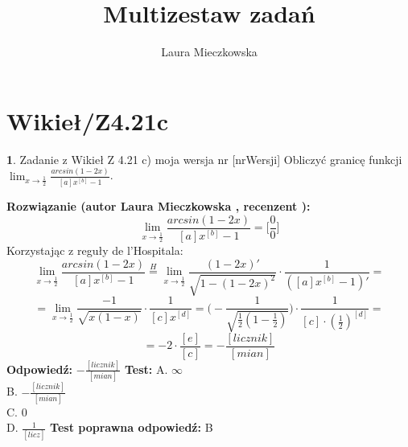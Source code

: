 \documentclass[12pt, a4paper]{article}
\title{Multizestaw zadań}
\author{Laura Mieczkowska}
\date{}
\theoremstyle{definition} %
\newtheorem{zad}{}
\newcommand{\kategoria}[1]{\section{#1}} %
\newcommand{\zadStart}[1]{\begin{zad}#1\newline} %
\newcommand{\zadStop}{\end{zad}}   %
\newcommand{\rozwStart}[2]{\noindent \textbf{Rozwiązanie (autor #1 , recenzent #2): }\newline} %
\newcommand{\odpStart}{\noindent \textbf{Odpowiedź:}\newline}    %
\newcommand{\odpStop}{\newline}                                             %
\newcommand{\testStart}{\noindent \textbf{Test:}\newline} %
\newcommand{\testStop}{\newline} %
\newcommand{\kluczStart}{\noindent \textbf{Test poprawna odpowiedź:}\newline} %
\newcommand{\kluczStop}{\newline} %
\begin{document}
\maketitle


\kategoria{Wikieł/Z4.21c}
\zadStart{Zadanie z Wikieł Z 4.21 c) moja wersja nr [nrWersji]}
Obliczyć granicę funkcji $\lim_{x \to \frac{1}{2}} \frac{arcsin(1-2x)}{[a]x^{[b]}-1}$.
\zadStop
\rozwStart{Laura Mieczkowska}{}
$$\lim_{x \to \frac{1}{2}} \frac{arcsin(1-2x)}{[a]x^{[b]}-1}=\bigg[\frac{0}{0}\bigg]$$
Korzystając z reguły de l'Hospitala:
$$\lim_{x \to \frac{1}{2}} \frac{arcsin(1-2x)}{[a]x^{[b]}-1} \stackrel{H}{=}
\lim_{x\to\frac{1}{2}} \frac{(1-2x)'}{\sqrt{1-(1-2x)^2}}\cdot \frac{1}{([a]x^{[b]}-1)'}=$$
$$=\lim_{x\to\frac{1}{2}} \frac{-1}{\sqrt{x(1-x)}}\cdot \frac{1}{[c]x^{[d]}}=\bigg(-\frac{1}{\sqrt{\frac{1}{2}(1-\frac{1}{2})}}\bigg)\cdot \frac{1}{[c]\cdot(\frac{1}{2})^{[d]}}=$$
$$=-2\cdot\frac{[e]}{[c]}=-\frac{[licznik]}{[mian]}$$
\odpStart
$-\frac{[licznik]}{[mian]}$
\odpStop
\testStart
A. $\infty$ \\
B. $-\frac{[licznik]}{[mian]}$ \\
C. $0$ \\
D. $\frac{1}{[licz]}$ 
\testStop
\kluczStart
B
\kluczStop
\end{document}
